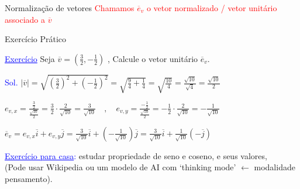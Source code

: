 \documentclass{beamer}
\begin{document}
\begin{frame}{Normalização de vetores}
	\textcolor{red}{ Chamamos $\overline{e}_v$ o vetor normalizado / vetor unitário associado a $\overline{v}$}
\end{frame}

	
\begin{frame}{Exercício Prático}
	\scriptsize
	
	\textcolor{blue}{\underline{Exercício}} \hspace{0.5cm} Seja $\overline{v} = \left(\frac{3}{2} , -\frac{1}{2}\right)$ , Calcule o vetor unitário $\overline{e}_v$.
	
	\vspace{0.6cm}
	\textcolor{blue}{Sol.} \hspace{0.5cm} $\displaystyle |\overline{v}| = \sqrt{\left(\frac{3}{2}\right)^2 + \left(-\frac{1}{2}\right)^2} = \sqrt{\frac{9}{4} + \frac{1}{4}} = \sqrt{\frac{10}{4}} = \frac{\sqrt{10}}{\sqrt{4}} = \frac{\sqrt{10}}{2}$
	
	\vspace{0.7cm}
	$\displaystyle e_{v,x} = \frac{\frac{3}{2}}{\frac{\sqrt{10}}{2}} = \frac{3}{2} \cdot \frac{2}{\sqrt{10}} = \frac{3}{\sqrt{10}} \quad , \quad e_{v,y} = \frac{-\frac{1}{2}}{\frac{\sqrt{10}}{2}} = -\frac{1}{2} \cdot \frac{2}{\sqrt{10}} = -\frac{1}{\sqrt{10}}$
	
	\vspace{0.7cm}
	$\displaystyle \overline{e}_v = e_{v,x} \overline{i} + e_{v,y} \overline{j} = \frac{3}{\sqrt{10}} \overline{i} + \left(-\frac{1}{\sqrt{10}}\right) \overline{j} = \frac{3}{\sqrt{10}} \overline{i} + \frac{1}{\sqrt{10}} (-\overline{j})$
	
	\vspace{0.8cm}
	\textcolor{blue}{\underline{Exercício para casa}:} estudar propriedade de seno e coseno, e seus valores, \\
	(Pode usar Wikipedia ou um modelo de AI com `thinking mode' $\leftarrow$ modalidade pensamento).
\end{frame}

	
\end{document}
